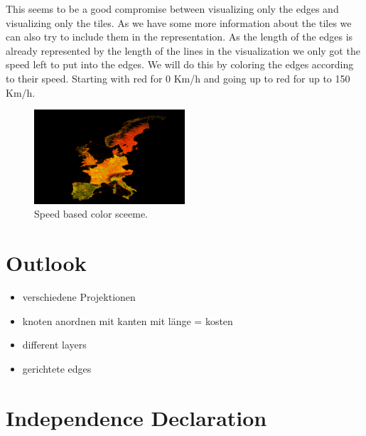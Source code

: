 \documentclass
[
	paper = a4,
    pagesize,
	12 pt,
	oneside,                       %
    open = right,
	DIV = calc,
	BCOR = 0 mm,                   %
	bibtotoc
]
{scrbook}
\begin{document}
This seems to be a good compromise between visualizing only the edges and visualizing only the tiles.
As we have some more information about the tiles we can also try to include them in the representation.
As the length of the edges is already represented by the length of the lines in the visualization we only got the speed left to put into the edges.
We will do this by coloring the edges according to their speed.
Starting with red for 0 Km/h and going up to red for up to 150 Km/h.

\begin{figure}[H]
	\includegraphics[width=0.5\textwidth]{Images/placeholder.png}
\caption[]{Speed based color sceeme.}
\label{fig:splitted tiles}
\end{figure}



\chapter{Outlook}
\begin{itemize}
	\item verschiedene Projektionen
	\item knoten anordnen mit kanten mit länge = kosten
	\item different layers
	\item gerichtete edges
\end{itemize}



\chapter*{Independence Declaration}

\end{document}
